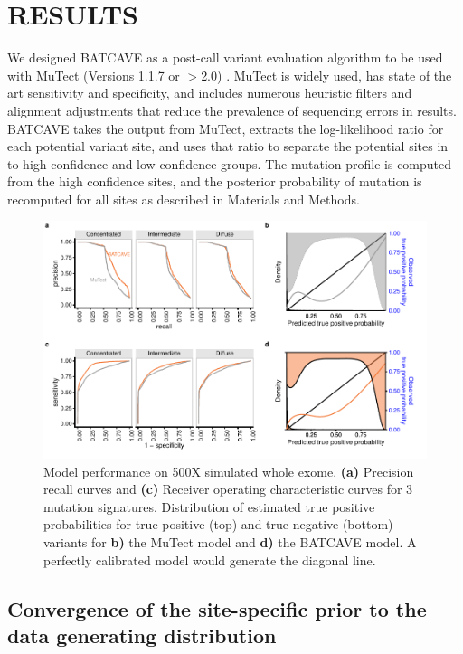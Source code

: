 \documentclass[a4,center,fleqn]{NAR}
\newcommand{\batcave}{BATCAVE }
\begin{document}
\section{RESULTS}
We designed \batcave as a post-call variant evaluation algorithm to be used with MuTect (Versions 1.1.7 or $>$2.0) \cite{Cibulskis2013}.
MuTect is widely used, has state of the art sensitivity and specificity, and includes numerous heuristic filters and alignment adjustments that reduce the prevalence of sequencing errors in results.
\batcave takes the output from MuTect, extracts the log-likelihood ratio for each potential variant site, and uses that ratio to separate the potential sites in to high-confidence and low-confidence groups.
The mutation profile is computed from the high confidence sites, and the posterior probability of mutation is recomputed for all sites as described in Materials and Methods.
\begin{figure}
  \begin{center}
  \includegraphics{figures/fig_wes.pdf}
  \end{center}
  \caption{Model performance on 500X simulated whole exome.
  \textbf{(a)} Precision recall curves and \textbf{(c)} Receiver operating characteristic curves for 3 mutation signatures.
  Distribution of estimated true positive probabilities for true positive (top) and true negative (bottom) variants for \textbf{b)} the MuTect model and \textbf{d)} the \batcave model.
  A perfectly calibrated model would generate the diagonal line.}
\label{NAR-wes_fig}
\end{figure}
\subsection{Convergence of the site-specific prior to the data generating distribution}
\end{document}

